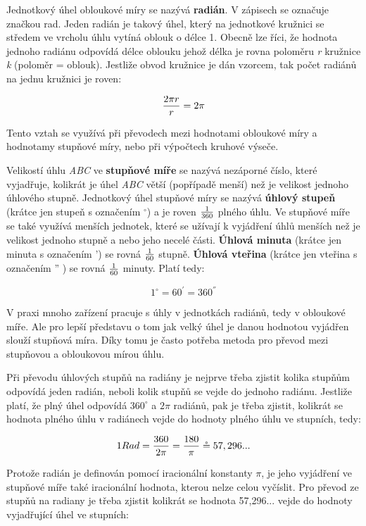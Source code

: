 Jednotkový úhel obloukové míry se nazývá {\bf radián}. V zápisech se označuje značkou rad. Jeden radián je takový úhel, který na jednotkové kružnici se středem ve vrcholu úhlu vytíná oblouk o délce 1. Obecně lze říci, že hodnota jednoho radiánu odpovídá délce oblouku jehož délka je rovna poloměru {\it r} kružnice {\it k} (poloměr = oblouk). Jestliže obvod kružnice je dán vzorcem, tak počet radiánů na jednu kružnici je roven:

$$ {{2\pi r}\over{r}} = 2\pi$$

Tento vztah se využívá při převodech mezi hodnotami obloukové míry a hodnotamy stupňové míry, nebo při výpočtech kruhové výseče.

\vskip 4mm
\centerline{}
\vskip 4mm


Velikostí úhlu {\it ABC} ve {\bf stupňové míře} se nazývá nezáporné číslo, které vyjadřuje, kolikrát je úhel {\it ABC} větší (popřípadě menší) než je velikost jednoho úhlového stupně. Jednotkový úhel stupňové míry se nazývá {\bf úhlový stupeň} (krátce jen stupeň s označením $^\circ$) a je roven $1\over 360$ plného úhlu. Ve stupňové míře se také využívá menších jednotek, které se užívají k vyjádření úhlů menších než je velikost jednoho stupně a nebo jeho necelé části. {\bf Úhlová minuta} (krátce jen minuta s označením ') se rovná $1\over 60$ stupně. {\bf Úhlová vteřina} (krátce jen vteřina s označením '' ) se rovná $1\over 60$ minuty. Platí tedy:

$$ 1^{\circ} =60^{'} = 360^{''}  $$


V praxi mnoho zařízení pracuje s úhly v jednotkách radiánů, tedy v obloukové míře. Ale pro lepší představu o tom jak velký úhel je danou hodnotou vyjádřen slouží stupňová míra. Díky tomu je často potřeba metoda pro převod mezi stupňovou a obloukovou mírou úhlu.

Při převodu úhlových stupňů na radiány je nejprve třeba zjistit kolika stupňům odpovídá jeden radián, neboli kolik stupňů se vejde do jednoho radiánu. Jestliže platí, že plný úhel odpovídá $360^\circ$ a $2\pi$ radiánů, pak je třeba zjistit, kolikrát se hodnota plného úhlu v radiánech vejde do hodnoty plného úhlu ve stupních, tedy:

$$ 1Rad = {{360}\over {2\pi}}={180\over\pi}\circeq 57,296...$$

Protože radián je definován pomocí iracionální konstanty $\pi$, je jeho vyjádření ve stupňové míře také iracionální hodnota, kterou nelze celou vyčíslit. Pro převod ze stupňů na radiany je třeba zjistit kolikrát se hodnota 57,296... vejde do hodnoty vyjadřující úhel ve stupních:

